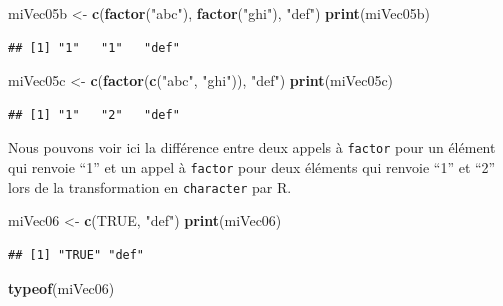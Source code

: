 \documentclass[twoside,symmetric]{book}
\newenvironment{Shaded}{}{}
\newcommand{\KeywordTok}[1]{\textbf{#1}}
\newcommand{\NormalTok}[1]{#1}
\newcommand{\OtherTok}[1]{#1}
\newcommand{\StringTok}[1]{#1}
\begin{document}
\begin{Shaded}
\begin{Highlighting}[]
\NormalTok{miVec05b <-}\StringTok{ }\KeywordTok{c}\NormalTok{(}\KeywordTok{factor}\NormalTok{(}\StringTok{"abc"}\NormalTok{), }\KeywordTok{factor}\NormalTok{(}\StringTok{"ghi"}\NormalTok{), }\StringTok{"def"}\NormalTok{)}
\KeywordTok{print}\NormalTok{(miVec05b)}
\end{Highlighting}
\end{Shaded}

\begin{verbatim}
## [1] "1"   "1"   "def"
\end{verbatim}

\begin{Shaded}
\begin{Highlighting}[]
\NormalTok{miVec05c <-}\StringTok{ }\KeywordTok{c}\NormalTok{(}\KeywordTok{factor}\NormalTok{(}\KeywordTok{c}\NormalTok{(}\StringTok{"abc"}\NormalTok{, }\StringTok{"ghi"}\NormalTok{)), }\StringTok{"def"}\NormalTok{)}
\KeywordTok{print}\NormalTok{(miVec05c)}
\end{Highlighting}
\end{Shaded}

\begin{verbatim}
## [1] "1"   "2"   "def"
\end{verbatim}

Nous pouvons voir ici la différence entre deux appels à \texttt{factor} pour un élément qui renvoie ``1'' et un appel à \texttt{factor} pour deux éléments qui renvoie ``1'' et ``2'' lors de la transformation en \texttt{character} par R.

\begin{Shaded}
\begin{Highlighting}[]
\NormalTok{miVec06 <-}\StringTok{ }\KeywordTok{c}\NormalTok{(}\OtherTok{TRUE}\NormalTok{, }\StringTok{"def"}\NormalTok{)}
\KeywordTok{print}\NormalTok{(miVec06)}
\end{Highlighting}
\end{Shaded}

\begin{verbatim}
## [1] "TRUE" "def"
\end{verbatim}

\begin{Shaded}
\begin{Highlighting}[]
\KeywordTok{typeof}\NormalTok{(miVec06)}
\end{Highlighting}
\end{Shaded}
\end{document}
